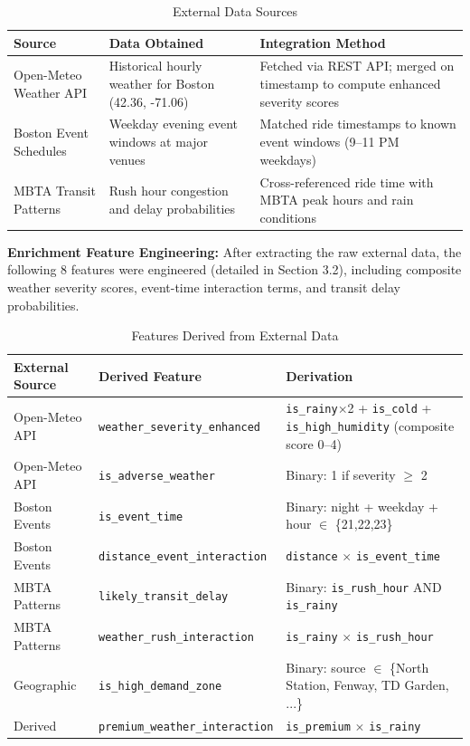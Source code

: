 \documentclass[12pt,a4paper]{article}
\begin{document}
\begin{table}[H]
\centering
\caption{External Data Sources}
\footnotesize
\begin{tabular}{lp{4.5cm}p{6cm}}
\toprule
\textbf{Source} & \textbf{Data Obtained} & \textbf{Integration Method} \\
\midrule
Open-Meteo Weather API & Historical hourly weather for Boston (42.36, -71.06) & Fetched via REST API; merged on timestamp to compute enhanced severity scores \\
Boston Event Schedules & Weekday evening event windows at major venues & Matched ride timestamps to known event windows (9--11 PM weekdays) \\
MBTA Transit Patterns & Rush hour congestion and delay probabilities & Cross-referenced ride time with MBTA peak hours and rain conditions \\
\bottomrule
\end{tabular}
\end{table}

\textbf{Enrichment Feature Engineering:} After extracting the raw external data, the following 8 features were engineered (detailed in Section 3.2), including composite weather severity scores, event-time interaction terms, and transit delay probabilities.

\begin{table}[H]
\centering
\caption{Features Derived from External Data}
\footnotesize
\begin{tabular}{llp{6.5cm}}
\toprule
\textbf{External Source} & \textbf{Derived Feature} & \textbf{Derivation} \\
\midrule
Open-Meteo API & \texttt{weather\_severity\_enhanced} & \texttt{is\_rainy}$\times$2 + \texttt{is\_cold} + \texttt{is\_high\_humidity} (composite score 0--4) \\
Open-Meteo API & \texttt{is\_adverse\_weather} & Binary: 1 if severity $\geq$ 2 \\
\addlinespace
Boston Events & \texttt{is\_event\_time} & Binary: night + weekday + hour $\in$ \{21,22,23\} \\
Boston Events & \texttt{distance\_event\_interaction} & \texttt{distance} $\times$ \texttt{is\_event\_time} \\
\addlinespace
MBTA Patterns & \texttt{likely\_transit\_delay} & Binary: \texttt{is\_rush\_hour} AND \texttt{is\_rainy} \\
MBTA Patterns & \texttt{weather\_rush\_interaction} & \texttt{is\_rainy} $\times$ \texttt{is\_rush\_hour} \\
\addlinespace
Geographic & \texttt{is\_high\_demand\_zone} & Binary: source $\in$ \{North Station, Fenway, TD Garden, ...\} \\
\addlinespace
Derived & \texttt{premium\_weather\_interaction} & \texttt{is\_premium} $\times$ \texttt{is\_rainy} \\
\bottomrule
\end{tabular}
\end{table}
\end{document}
